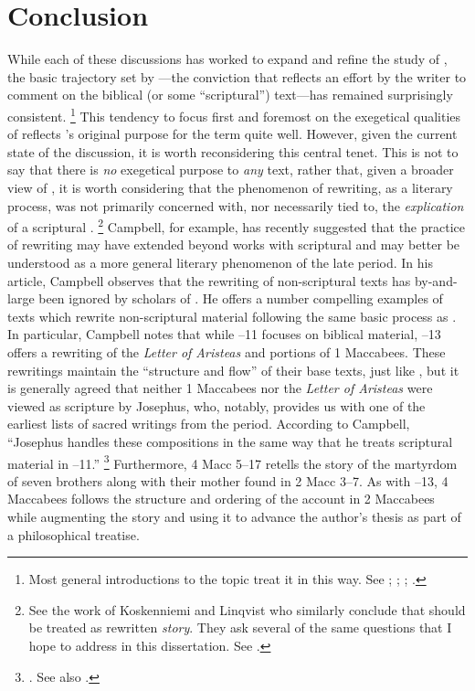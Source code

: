 \section{Conclusion}

While each of these discussions has worked to expand and refine the study of \rwb, the basic trajectory set by \vermes---the conviction that \rwb reflects an effort by the writer to comment on the biblical (or some ``scriptural'') text---has remained surprisingly consistent.%
    \footnote{%
        Most general introductions to the topic treat it in this way. See
        \cite{crawford_charlesworth2000};
        \cite{brooke_schiffman-vanderkam2000};
        \cite{zahn_lim-collins2010};
        \cite{zahn2011}.}
%
This tendency to focus first and foremost on the exegetical qualities of \rwb reflects \vermes's original purpose for the term quite well. However, given the current state of the discussion, it is worth reconsidering this central tenet. This is not to say that there is \emph{no} exegetical purpose to \emph{any} \rwb text, rather that, given a broader view of \rwb, it is worth considering that the phenomenon of rewriting, as a literary process, was not primarily concerned with, nor necessarily tied to, the \emph{explication} of a scriptural \vorlage.%
    \footnote{%
        See the work of Koskenniemi and Linqvist who similarly conclude that \rwb should be treated as rewritten \emph{story}. They ask several of the same questions that I hope to address in this dissertation. See 
        \cite{koskenniemi-lindqvist_laato-ruiten2008}.}
%
Campbell, for example, has recently suggested that the practice of rewriting may have extended beyond works with scriptural \vorlagen and may better be understood as a more general literary phenomenon of the late \secondtemple period.%
    \autocite{campbell_zsengeller2014} 
In his article, Campbell observes that the rewriting of non-scriptural texts has by-and-large been ignored by scholars of \rwb. He offers a number compelling examples of \secondtemple texts which rewrite non-scriptural material following the same basic process as \rwb. In particular, Campbell notes that while --11 focuses on biblical material, --13 offers a rewriting of the \emph{Letter of Aristeas} and portions of 1 Maccabees. These rewritings maintain the ``structure and flow'' of their base texts, just like \rwb, but it is generally agreed that neither 1 Maccabees nor the \emph{Letter of Aristeas} were viewed as scripture by Josephus, who, notably, provides us with one of the earliest lists of sacred writings from the period.%
    \autocite{mason2002_mcdonald-sanders2002}
According to Campbell, ``Josephus handles these compositions in the same way that he treats scriptural material in --11.''%
    \footnote{%
        \Cite[70]{campbell_zsengeller2014}. See also
        \cite[126]{mason2002_mcdonald-sanders2002}.}
Furthermore, 4 Macc 5--17 retells the story of the martyrdom of seven brothers along with their mother found in 2 Macc 3--7. As with --13, 4 Maccabees follows the structure and ordering of the account in 2 Maccabees while augmenting the story and using it to advance the author's thesis as part of a philosophical treatise. 

